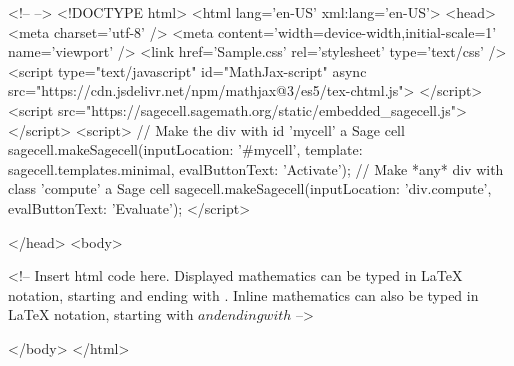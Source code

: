 <!--
-->
<!DOCTYPE html> 
<html lang='en-US' xml:lang='en-US'> 
<head> 
<meta charset='utf-8' /> 
<meta content='width=device-width,initial-scale=1' name='viewport' /> 
<link href='Sample.css' rel='stylesheet' type='text/css' /> 
<script type="text/javascript" id="MathJax-script" async
  src="https://cdn.jsdelivr.net/npm/mathjax@3/es5/tex-chtml.js">
</script> 
 <script src="https://sagecell.sagemath.org/static/embedded_sagecell.js"></script>
<script>
    // Make the div with id 'mycell' a Sage cell
    sagecell.makeSagecell({inputLocation:  '#mycell',
                           template:       sagecell.templates.minimal,
                           evalButtonText: 'Activate'});
    // Make *any* div with class 'compute' a Sage cell
    sagecell.makeSagecell({inputLocation: 'div.compute',
                           evalButtonText: 'Evaluate'});
    </script>

</head>
<body>

<!-- 
	Insert html code here. Displayed mathematics can be typed 
	in LaTeX notation, starting and ending with $$. Inline mathematics
	can also be typed in LaTeX notation, starting with \( and ending
	with \)
-->
   


</body> 
</html>